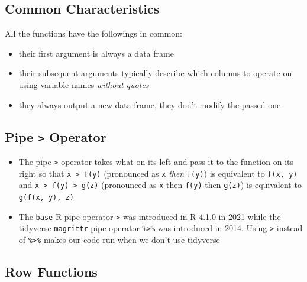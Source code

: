 \documentclass[
  letterpaper,
  DIV=11,
  numbers=noendperiod]{scrreprt}
\providecommand{\tightlist}{%
  \setlength{\itemsep}{0pt}\setlength{\parskip}{0pt}}\usepackage{longtable,booktabs,array}
\begin{document}
\subsection{Common Characteristics}\label{common-characteristics}

All the functions have the followings in common:

\begin{itemize}
\tightlist
\item
  their first argument is always a data frame
\item
  their subsequent arguments typically describe which columns to operate
  on using variable names \emph{without quotes}
\item
  they always output a new data frame, they don't modify the passed one
\end{itemize}

\subsection{\texorpdfstring{Pipe \texttt{\textbar{}\textgreater{}}
Operator}{Pipe \textbar\textgreater{} Operator}}\label{pipe-operator}

\begin{itemize}
\tightlist
\item
  The pipe \texttt{\textbar{}\textgreater{}} operator takes what on its
  left and pass it to the function on its right so that
  \texttt{x\ \textbar{}\textgreater{}\ f(y)} (pronounced as \texttt{x}
  \emph{then} \texttt{f(y)}) is equivalent to \texttt{f(x,\ y)} and
  \texttt{x\ \textbar{}\textgreater{}\ f(y)\ \textbar{}\textgreater{}\ g(z)}
  (pronounced as \texttt{x} then \texttt{f(y)} then \texttt{g(z)}) is
  equivalent to \texttt{g(f(x,\ y),\ z)}
\item
  The \texttt{base} R pipe operator \texttt{\textbar{}\textgreater{}}
  was introduced in R 4.1.0 in 2021 while the tidyverse
  \texttt{magrittr} pipe operator \texttt{\%\textgreater{}\%} was
  introduced in 2014. Using \texttt{\textbar{}\textgreater{}} instead of
  \texttt{\%\textgreater{}\%} makes our code run when we don't use
  tidyverse
\end{itemize}

\subsection{Row Functions}\label{row-functions}
\end{document}
